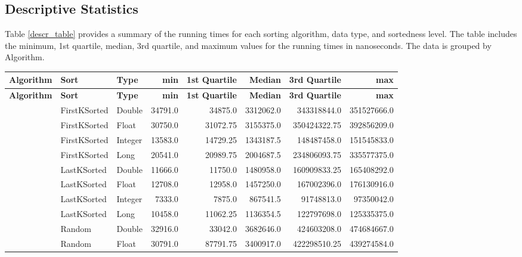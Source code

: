 \documentclass[unicode,11pt,a4paper,oneside,numbers=endperiod,openany]{scrartcl}
\begin{document}
    \subsection{Descriptive Statistics}
    Table \ref{descr_table} provides a summary of the running times for each sorting algorithm, data type, and sortedness level. The table includes the minimum, 1st quartile, median, 3rd quartile, and maximum values for the running times in nanoseconds. The data is grouped by Algorithm.\\
    \begin{center}
        \footnotesize
        \begin{longtable}{|l|l|l|r|r|r|r|r|}
            \hline
            \textbf{Algorithm} & \textbf{Sort} & \textbf{Type} & \textbf{min} & \textbf{1st Quartile} & \textbf{Median} & \textbf{3rd Quartile} & \textbf{max} \\
            \hline
            \endfirsthead
            \hline
            \textbf{Algorithm} & \textbf{Sort} & \textbf{Type} & \textbf{min} & \textbf{1st Quartile} & \textbf{Median} & \textbf{3rd Quartile} & \textbf{max} \\
            \hline
            \endhead
            \hline
            \endfoot
            \multirow{16}{*}{BSUNC} & FirstKSorted & Double & 34791.0 & 34875.0 & 3312062.0 & 343318844.0 & 351527666.0 \\
            & FirstKSorted & Float & 30750.0 & 31072.75 & 3155375.0 & 350424322.75 & 392856209.0 \\
            & FirstKSorted & Integer & 13583.0 & 14729.25 & 1343187.5 & 148487458.0 & 151545833.0 \\
            & FirstKSorted & Long & 20541.0 & 20989.75 & 2004687.5 & 234806093.75 & 335577375.0 \\
            & LastKSorted & Double & 11666.0 & 11750.0 & 1480958.0 & 160909833.25 & 165408292.0 \\
            & LastKSorted & Float & 12708.0 & 12958.0 & 1457250.0 & 167002396.0 & 176130916.0 \\
            & LastKSorted & Integer & 7333.0 & 7875.0 & 867541.5 & 91748813.0 & 97350042.0 \\
            & LastKSorted & Long & 10458.0 & 11062.25 & 1136354.5 & 122797698.0 & 125335375.0 \\
            & Random & Double & 32916.0 & 33042.0 & 3682646.0 & 424603208.0 & 474684667.0 \\
            & Random & Float & 30791.0 & 87791.75 & 3400917.0 & 422298510.25 & 439274584.0 \\

\end{longtable}
\end{center}
\end{document}
